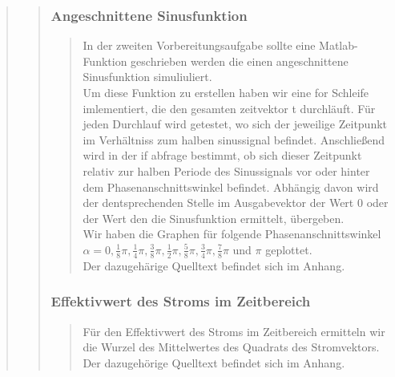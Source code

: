 \begin{quote}
\begin{quote}
\begin{quote}
        \end{quote}
        
    	\subsubsection{Angeschnittene Sinusfunktion}
        \begin{quote}
            In der zweiten Vorbereitungsaufgabe sollte eine Matlab-Funktion geschrieben werden die einen angeschnittene
            Sinusfunktion simuliuliert.\\
            Um diese Funktion zu erstellen haben wir eine for Schleife imlementiert, die den gesamten zeitvektor t
            durchläuft. Für jeden Durchlauf wird getestet, wo sich der jeweilige Zeitpunkt im Verhältniss zum halben
            sinussignal befindet. Anschließend wird in der if abfrage bestimmt, ob sich dieser Zeitpunkt relativ zur halben
            Periode des Sinussignals vor oder hinter dem Phasenanschnittswinkel befindet. Abhängig davon wird der
            dentsprechenden Stelle im Ausgabevektor der Wert $0$ oder der Wert den die Sinusfunktion ermittelt, übergeben.\\
            Wir haben die Graphen für folgende Phasenanschnittswinkel $ \alpha = 0, \frac{1}{8} \pi, \frac{1}{4}
            \pi, \frac{3}{8} \pi, \frac{1}{2} \pi,\frac{5}{8} \pi, \frac{3}{4} \pi, \frac{7}{8} \pi$ und $\pi$
            geplottet.\\
            Der dazugehärige Quelltext befindet sich im Anhang.
        \end{quote}
        
        \subsubsection{Effektivwert des Stroms im Zeitbereich}
        \begin{quote}
            Für den Effektivwert des Stroms im Zeitbereich ermitteln wir die Wurzel des Mittelwertes des Quadrats des
            Stromvektors.\\
            Der dazugehörige Quelltext befindet sich im Anhang.
        \end{quote}
        

\end{quote}
\end{quote}
